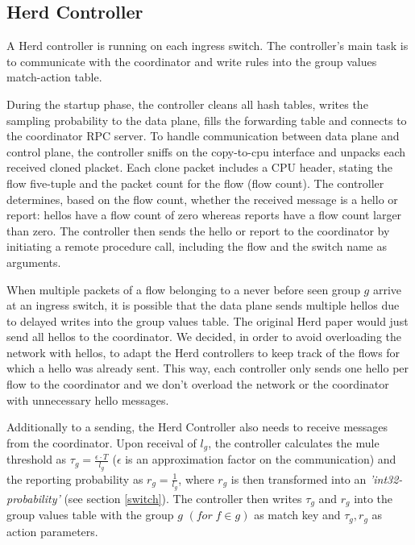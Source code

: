 \documentclass[11pt,oneside,a4paper]{article}
\begin{document}
\subsection{Herd Controller} \label{controller}

A Herd controller is running on each ingress switch. The controller's main task is to communicate with the coordinator and write rules into the group values match-action table.

\noindent During the startup phase, the controller cleans all hash tables, writes the sampling probability to the data plane, fills the forwarding table and connects to the coordinator RPC server. To handle communication between data plane and control plane, the controller sniffs on the copy-to-cpu interface and unpacks each received cloned placket. Each clone packet includes a CPU header, stating the flow five-tuple and the packet count for the flow (flow count). The controller determines, based on the flow count, whether the received message is a hello or report: hellos have a flow count of zero whereas reports have a flow count larger than zero. The controller then sends the hello or report to the coordinator by initiating a remote procedure call, including the flow and the switch name as arguments.

\noindent When multiple packets of a flow belonging to a never before seen group $g$ arrive at an ingress switch, it is possible that the data plane sends multiple hellos due to delayed writes into the group values table. The original Herd paper \cite{anon2019herd} would just send all hellos to the coordinator. We decided, in order to avoid overloading the network with hellos, to adapt the Herd controllers to keep track of the flows for which a hello was already sent. This way, each controller only sends one hello per flow to the coordinator and we don't overload the network or the coordinator with unnecessary hello messages.

\noindent Additionally to a sending, the Herd Controller also needs to receive messages from the coordinator. Upon receival of $l_g$, the controller calculates the mule threshold as $\tau_g = \frac{\epsilon \cdot T}{l_g}$ ($\epsilon$ is an approximation factor on the communication) and the reporting probability as $r_g = \frac{1}{l_g}$, where $r_g$ is then transformed into an \textit{'int32-probability'} (see section \ref{switch}). The controller then writes $\tau_g$ and $r_g$ into the group values table with the group $g$ $(for \; f \in g)$ as match key and $\tau_g, r_g$ as action parameters.
\end{document}
